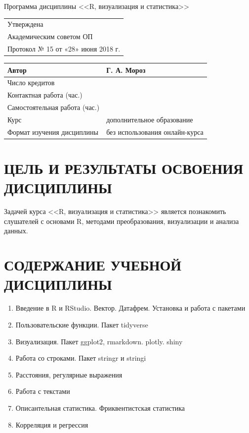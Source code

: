 \documentclass[a4paper]{article}
\begin{document}
\begin{center}
{\Large Программа дисциплины <<R, визуализация и статистика>>}
\end{center}
\begin{flushright}
\begin{tabular}{l}
Утверждена                          \\
Академическим советом ОП            \\
Протокол № 15 от  «28» июня 2018 г.
\end{tabular}
\end{flushright}
\begin{center}
\begin{tabular}{|l|l|}
\hline
Автор                         & Г. А. Мороз                    \\ \hline
Число кредитов                &                               \\ \hline
Контактная работа (час.)      &                              \\ \hline
Самостоятельная работа (час.) &                              \\ \hline
Курс                          & дополнительное образование \\ \hline
Формат изучения дисциплины    & без использования онлайн-курса \\ \hline
\end{tabular}
\end{center}
\section{ЦЕЛЬ И РЕЗУЛЬТАТЫ ОСВОЕНИЯ ДИСЦИПЛИНЫ}
Задачей курса <<R, визуализация и статистика>> является познакомить слушателей с основами R, методами преобразования, визуализации и анализа данных.
\section{СОДЕРЖАНИЕ УЧЕБНОЙ ДИСЦИПЛИНЫ}
\begin{enumerate}
\item Введение в R и RStudio. Вектор. Датафрем. Установка и работа с пакетами
\item Пользовательские функции. Пакет tidyverse
\item Визуализация. Пакет ggplot2, rmarkdown. plotly. shiny
\item Работа со строками. Пакет stringr и stringi
\item Расстояния, регулярные выражения
\item Работа с текстами
\item Описантельная статистика. Фриквентистская статистика
\item Корреляция и регрессия
\end{enumerate}
\end{document}
